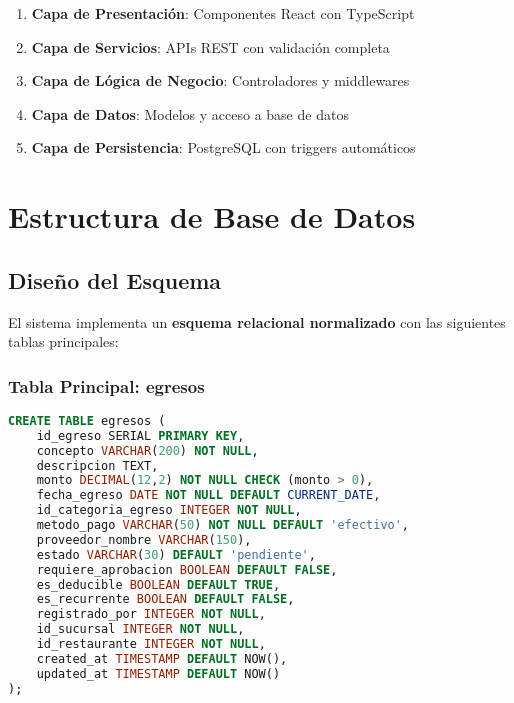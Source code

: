 \documentclass[12pt,a4paper]{article}
\newcommand{\highlight}[1]{\textcolor{primaryblue}{\textbf{#1}}}
\begin{document}
\begin{enumerate}[leftmargin=*]
    \item \textbf{Capa de Presentación}: Componentes React con TypeScript
    \item \textbf{Capa de Servicios}: APIs REST con validación completa
    \item \textbf{Capa de Lógica de Negocio}: Controladores y middlewares
    \item \textbf{Capa de Datos}: Modelos y acceso a base de datos
    \item \textbf{Capa de Persistencia}: PostgreSQL con triggers automáticos
\end{enumerate}


\section{Estructura de Base de Datos}

\subsection{Diseño del Esquema}
El sistema implementa un \highlight{esquema relacional normalizado} con las siguientes tablas principales:

\subsubsection{Tabla Principal: egresos}
\begin{lstlisting}[language=SQL, caption=Estructura de la tabla egresos]
CREATE TABLE egresos (
    id_egreso SERIAL PRIMARY KEY,
    concepto VARCHAR(200) NOT NULL,
    descripcion TEXT,
    monto DECIMAL(12,2) NOT NULL CHECK (monto > 0),
    fecha_egreso DATE NOT NULL DEFAULT CURRENT_DATE,
    id_categoria_egreso INTEGER NOT NULL,
    metodo_pago VARCHAR(50) NOT NULL DEFAULT 'efectivo',
    proveedor_nombre VARCHAR(150),
    estado VARCHAR(30) DEFAULT 'pendiente',
    requiere_aprobacion BOOLEAN DEFAULT FALSE,
    es_deducible BOOLEAN DEFAULT TRUE,
    es_recurrente BOOLEAN DEFAULT FALSE,
    registrado_por INTEGER NOT NULL,
    id_sucursal INTEGER NOT NULL,
    id_restaurante INTEGER NOT NULL,
    created_at TIMESTAMP DEFAULT NOW(),
    updated_at TIMESTAMP DEFAULT NOW()
);
\end{lstlisting}
\end{document}
